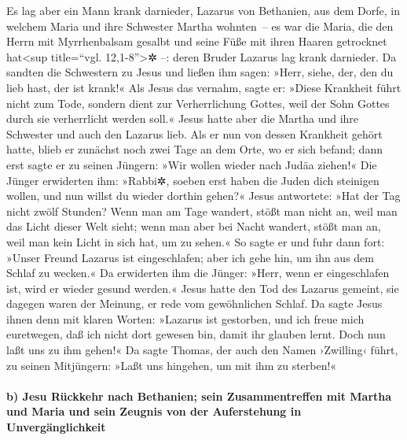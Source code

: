  Es lag aber ein Mann krank darnieder, Lazarus von
Bethanien, aus dem Dorfe, in welchem Maria und ihre Schwester Martha
wohnten~--  es war die Maria, die den Herrn mit
Myrrhenbalsam gesalbt und seine Füße mit ihren Haaren getrocknet
hat\textless sup title=``vgl. 12,1-8''\textgreater✲ --: deren Bruder
Lazarus lag krank darnieder.  Da sandten die Schwestern zu
Jesus und ließen ihm sagen: »Herr, siehe, der, den du lieb hast, der ist
krank!«  Als Jesus das vernahm, sagte er: »Diese Krankheit
führt nicht zum Tode, sondern dient zur Verherrlichung Gottes, weil der
Sohn Gottes durch sie verherrlicht werden soll.«  Jesus
hatte aber die Martha und ihre Schwester und auch den Lazarus lieb.
 Als er nun von dessen Krankheit gehört hatte, blieb er
zunächst noch zwei Tage an dem Orte, wo er sich befand; 
dann erst sagte er zu seinen Jüngern: »Wir wollen wieder nach Judäa
ziehen!«  Die Jünger erwiderten ihm: »Rabbi✲, soeben erst
haben die Juden dich steinigen wollen, und nun willst du wieder dorthin
gehen?«  Jesus antwortete: »Hat der Tag nicht zwölf
Stunden? Wenn man am Tage wandert, stößt man nicht an, weil man das
Licht dieser Welt sieht;  wenn man aber bei Nacht
wandert, stößt man an, weil man kein Licht in sich hat, um zu sehen.«
 So sagte er und fuhr dann fort: »Unser Freund Lazarus
ist eingeschlafen; aber ich gehe hin, um ihn aus dem Schlaf zu wecken.«
 Da erwiderten ihm die Jünger: »Herr, wenn er
eingeschlafen ist, wird er wieder gesund werden.«  Jesus
hatte den Tod des Lazarus gemeint, sie dagegen waren der Meinung, er
rede vom gewöhnlichen Schlaf.  Da sagte Jesus ihnen denn
mit klaren Worten: »Lazarus ist gestorben,  und ich freue
mich euretwegen, daß ich nicht dort gewesen bin, damit ihr glauben
lernt. Doch nun laßt uns zu ihm gehen!«  Da sagte Thomas,
der auch den Namen ›Zwilling‹ führt, zu seinen Mitjüngern: »Laßt uns
hingehen, um mit ihm zu sterben!«

\hypertarget{b-jesu-ruxfcckkehr-nach-bethanien-sein-zusammentreffen-mit-martha-und-maria-und-sein-zeugnis-von-der-auferstehung-in-unverguxe4nglichkeit}{%
\paragraph{b) Jesu Rückkehr nach Bethanien; sein Zusammentreffen mit
Martha und Maria und sein Zeugnis von der Auferstehung in
Unvergänglichkeit}\label{b-jesu-ruxfcckkehr-nach-bethanien-sein-zusammentreffen-mit-martha-und-maria-und-sein-zeugnis-von-der-auferstehung-in-unverguxe4nglichkeit}}

